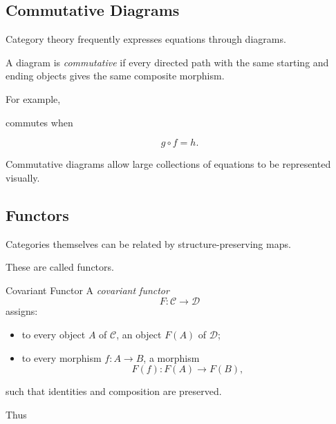 \subsection{Commutative Diagrams}
\label{subsec:commutative-diagrams}

Category theory frequently expresses equations through diagrams.

A diagram is \emph{commutative} if every directed path with the same starting
and ending objects gives the same composite morphism.

For example,

\begin{center}
\end{center}

commutes when

\[ g\circ f=h. \]

Commutative diagrams allow large collections of equations to be represented
visually.

\subsection{Functors}
\label{subsec:functors}

Categories themselves can be related by structure-preserving maps.

These are called functors.

\begin{definitionbox}{Covariant Functor}
A \emph{covariant functor}
\[ F:\mathcal C\to\mathcal D \]
assigns:
\begin{itemize}
    \item to every object \(A\) of \(\mathcal C\), an object \(F(A)\) of
    \(\mathcal D\);
    \item to every morphism \(f:A\to B\), a morphism
    \[ F(f):F(A)\to F(B), \]
\end{itemize}
such that identities and composition are preserved.
\end{definitionbox}

Thus

